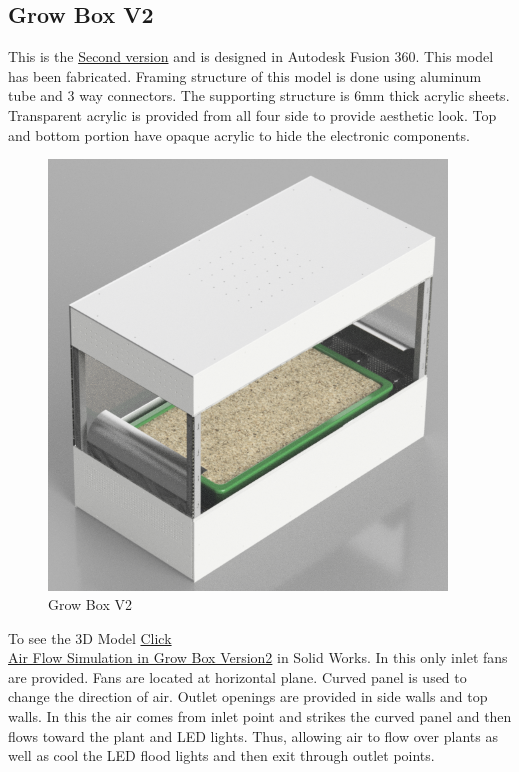 \documentclass[a4paper,12pt,oneside]{book}
\begin{document}
\subsection{Grow Box V2}
This is the \href{https://www.youtube.com/watch?v=TTjnuqw7IV8}{Second version} and is designed in Autodesk Fusion 360. This model has been fabricated. Framing structure of this model is done using aluminum tube and 3 way connectors. The supporting structure is 6mm thick acrylic sheets. Transparent acrylic is provided from all four side to provide aesthetic look. Top and bottom portion have opaque acrylic to hide the electronic  components.\\
\begin{figure}[h!]
 \begin{center}
\includegraphics[width=300pt]{version2}
\caption{Grow Box V2}
\end{center}
\end{figure}
To see the 3D Model  \href{http://a360.co/2sLIiCD}{Click}\\
\href{https://www.youtube.com/watch?v=ab_HcFKEwkE}{Air Flow Simulation in Grow Box Version2} in Solid Works. In this only inlet fans are provided. Fans are located at horizontal plane. Curved panel is used to change the direction of air. Outlet openings are provided in side walls and top walls.
In this the air comes from inlet point and strikes the curved panel and then flows toward the plant and LED lights. Thus, allowing air to flow over plants as well as cool the LED flood lights and then exit through outlet points. \\
\end{document}
